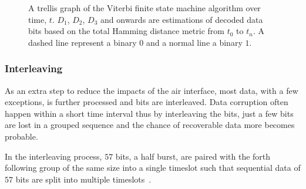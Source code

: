 \begin{figure}[H]
  \centering
  \caption{A trellis graph of the Viterbi finite state machine
    algorithm over time, $t$. $D_1$, $D_2$, $D_3$ and onwards are
    estimations of decoded data bits based on the total Hamming
    distance metric from $t_0$ to $t_n$. A dashed line represent a
    binary $0$ and a normal line a binary $1$.}
  \label{fig:viterbi_trellis}
\end{figure}

\subsubsection{Interleaving}
As an extra step to reduce the impacts of the air interface, most
data, with a few exceptions, is further processed and bits are
interleaved. Data corruption often happen within a short time interval
thus by interleaving the bits, just a few bits are lost in a grouped
sequence and the chance of recoverable data more becomes probable.

In the interleaving process, $57$ bits, a half burst, are paired with
the forth following group of the same size into a single timeslot such
that sequential data of $57$ bits are split into multiple
timeslots~\cite[p. 100--101, 358]{gsmnetworks}.

